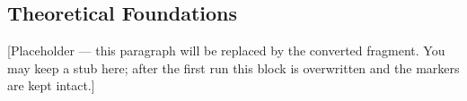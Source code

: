 %
%
%

\subsection{Theoretical Foundations}
\label{sec:theory}

[Placeholder — this paragraph will be replaced by the converted
fragment. You may keep a stub here; after the first run this block is
overwritten and the markers are kept intact.]

